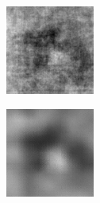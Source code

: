 \begin{figure}[H]
\begin{subfigure}[t]{0.15\textwidth}
    \includegraphics[width=\linewidth]{img/ten-trials/prediction_1_lr.png}
  \end{subfigure}
  \begin{subfigure}[t]{0.15\textwidth}
    \centering
    \includegraphics[width=\linewidth]{img/ten-trials/prediction_1_cnnv1.png}

\end{subfigure}
\end{figure}
